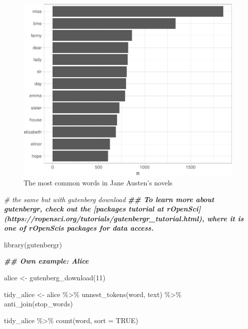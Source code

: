 \documentclass[
]{article}
\newenvironment{Shaded}{\begin{snugshade}}{\end{snugshade}}
\newcommand{\AttributeTok}[1]{\textcolor[rgb]{0.77,0.63,0.00}{#1}}
\newcommand{\CommentTok}[1]{\textcolor[rgb]{0.56,0.35,0.01}{\textit{#1}}}
\newcommand{\ConstantTok}[1]{\textcolor[rgb]{0.00,0.00,0.00}{#1}}
\newcommand{\DecValTok}[1]{\textcolor[rgb]{0.00,0.00,0.81}{#1}}
\newcommand{\DocumentationTok}[1]{\textcolor[rgb]{0.56,0.35,0.01}{\textbf{\textit{#1}}}}
\newcommand{\FunctionTok}[1]{\textcolor[rgb]{0.00,0.00,0.00}{#1}}
\newcommand{\NormalTok}[1]{#1}
\newcommand{\OtherTok}[1]{\textcolor[rgb]{0.56,0.35,0.01}{#1}}
\newcommand{\SpecialCharTok}[1]{\textcolor[rgb]{0.00,0.00,0.00}{#1}}
\begin{document}
\begin{figure}
\centering
\includegraphics{homework_1_files/figure-latex/plotcount-1.pdf}
\caption{The most common words in Jane Austen's novels}
\end{figure}

\begin{Shaded}
\begin{Highlighting}[]
\CommentTok{\# the same but with gutenberg download}
\DocumentationTok{\#\# To learn more about gutenbergr, check out the [package\textquotesingle{}s tutorial at rOpenSci](https://ropensci.org/tutorials/gutenbergr\_tutorial.html), where it is one of rOpenSci\textquotesingle{}s packages for data access.}
\end{Highlighting}
\end{Shaded}

\begin{Shaded}
\begin{Highlighting}[]
\FunctionTok{library}\NormalTok{(gutenbergr)}

\DocumentationTok{\#\# Own example: Alice}

\NormalTok{alice }\OtherTok{\textless{}{-}} \FunctionTok{gutenberg\_download}\NormalTok{(}\DecValTok{11}\NormalTok{)}

\NormalTok{tidy\_alice }\OtherTok{\textless{}{-}}\NormalTok{ alice }\SpecialCharTok{\%\textgreater{}\%}
  \FunctionTok{unnest\_tokens}\NormalTok{(word, text) }\SpecialCharTok{\%\textgreater{}\%}
  \FunctionTok{anti\_join}\NormalTok{(stop\_words)}

\NormalTok{tidy\_alice }\SpecialCharTok{\%\textgreater{}\%}
  \FunctionTok{count}\NormalTok{(word, }\AttributeTok{sort =} \ConstantTok{TRUE}\NormalTok{)}
\end{Highlighting}
\end{Shaded}
\end{document}
